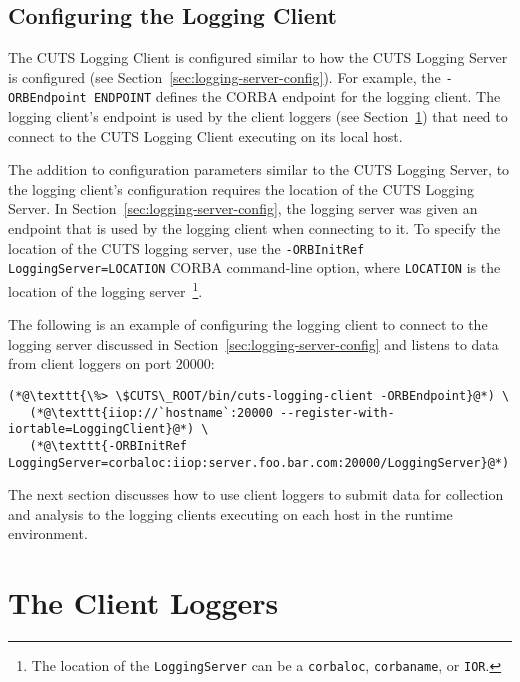 \subsection{Configuring the Logging Client}

The CUTS Logging Client is configured similar to how the CUTS Logging
Server is configured (see Section~\ref{sec:logging-server-config}). For
example, the \texttt{-ORBEndpoint ENDPOINT} defines the CORBA endpoint
for the logging client. The logging client's endpoint is used by the 
client loggers (see Section~\ref{sec:client-loggers}) that need to 
connect to the CUTS Logging Client executing on its local host.

The addition to configuration parameters similar to the CUTS Logging 
Server, to the logging client's configuration requires the location 
of the CUTS Logging Server. In Section~\ref{sec:logging-server-config},
the logging server was given an endpoint that is used by the logging
client when connecting to it. To specify the location of the CUTS
logging server, use the \texttt{-ORBInitRef LoggingServer=LOCATION} 
CORBA command-line option, where \texttt{LOCATION} is the location
of the logging server~\footnote{The location of the \texttt{LoggingServer}
can be a \texttt{corbaloc}, \texttt{corbaname}, or \texttt{IOR}.}.

The following is an example of configuring the logging client to 
connect to the logging server discussed in 
Section~\ref{sec:logging-server-config} and listens to data from
client loggers on port 20000:
\begin{lstlisting}
(*@\texttt{\%> \$CUTS\_ROOT/bin/cuts-logging-client -ORBEndpoint}@*) \
   (*@\texttt{iiop://`hostname`:20000 --register-with-iortable=LoggingClient}@*) \
   (*@\texttt{-ORBInitRef LoggingServer=corbaloc:iiop:server.foo.bar.com:20000/LoggingServer}@*)
\end{lstlisting}
The next section discusses how to use client loggers to submit data
for collection and analysis to the logging clients executing on each
host in the runtime environment.

\section{The Client Loggers}
\label{sec:client-loggers}
